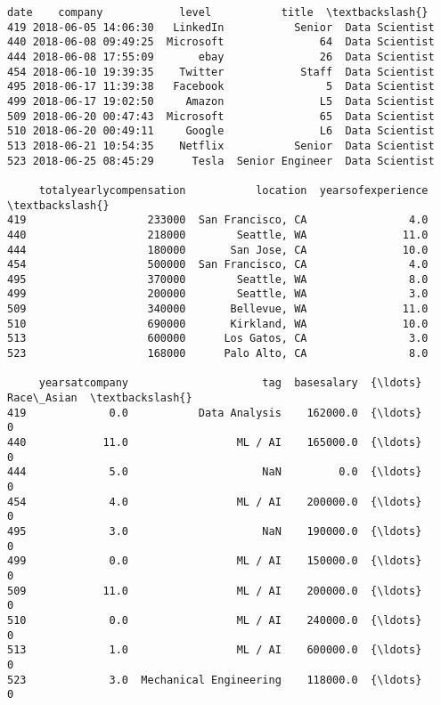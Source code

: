 \documentclass[11pt]{article}
\begin{document}
    \begin{Verbatim}[commandchars=\\\{\}]
                   date    company            level           title  \textbackslash{}
419 2018-06-05 14:06:30   LinkedIn           Senior  Data Scientist
440 2018-06-08 09:49:25  Microsoft               64  Data Scientist
444 2018-06-08 17:55:09       ebay               26  Data Scientist
454 2018-06-10 19:39:35    Twitter            Staff  Data Scientist
495 2018-06-17 11:39:38   Facebook                5  Data Scientist
499 2018-06-17 19:02:50     Amazon               L5  Data Scientist
509 2018-06-20 00:47:43  Microsoft               65  Data Scientist
510 2018-06-20 00:49:11     Google               L6  Data Scientist
513 2018-06-21 10:54:35    Netflix           Senior  Data Scientist
523 2018-06-25 08:45:29      Tesla  Senior Engineer  Data Scientist

     totalyearlycompensation           location  yearsofexperience  \textbackslash{}
419                   233000  San Francisco, CA                4.0
440                   218000        Seattle, WA               11.0
444                   180000       San Jose, CA               10.0
454                   500000  San Francisco, CA                4.0
495                   370000        Seattle, WA                8.0
499                   200000        Seattle, WA                3.0
509                   340000       Bellevue, WA               11.0
510                   690000       Kirkland, WA               10.0
513                   600000      Los Gatos, CA                3.0
523                   168000      Palo Alto, CA                8.0

     yearsatcompany                     tag  basesalary  {\ldots}  Race\_Asian  \textbackslash{}
419             0.0           Data Analysis    162000.0  {\ldots}           0
440            11.0                 ML / AI    165000.0  {\ldots}           0
444             5.0                     NaN         0.0  {\ldots}           0
454             4.0                 ML / AI    200000.0  {\ldots}           0
495             3.0                     NaN    190000.0  {\ldots}           0
499             0.0                 ML / AI    150000.0  {\ldots}           0
509            11.0                 ML / AI    200000.0  {\ldots}           0
510             0.0                 ML / AI    240000.0  {\ldots}           0
513             1.0                 ML / AI    600000.0  {\ldots}           0
523             3.0  Mechanical Engineering    118000.0  {\ldots}           0


\end{Verbatim}
\end{document}
